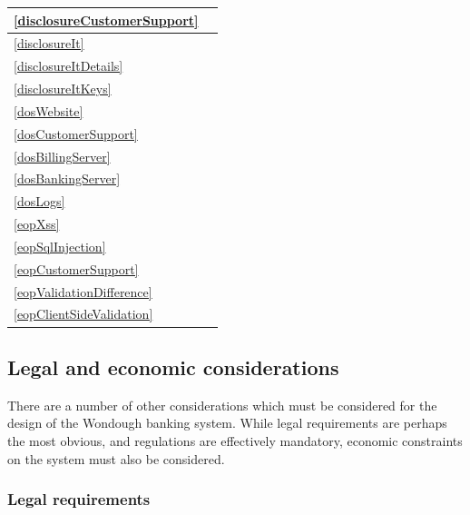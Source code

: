 \begin{center}
\begin{tabular}{|| p{3em} | p{15em} ||}
    \\ \hline \ref{disclosureCustomerSupport} &
        
    \\ \hline \ref{disclosureIt} &
        
    \\ \hline \ref{disclosureItDetails} &
        
    \\ \hline \ref{disclosureItKeys} &
        
    \\ \hline \ref{dosWebsite} &
        
    \\ \hline \ref{dosCustomerSupport} &
        
    \\ \hline \ref{dosBillingServer} &
        
    \\ \hline \ref{dosBankingServer} &
        
    \\ \hline \ref{dosLogs} &

    \\ \hline \ref{eopXss} &

    \\ \hline \ref{eopSqlInjection} &
        
    \\ \hline \ref{eopCustomerSupport} &

    \\ \hline \ref{eopValidationDifference} & 
        
    \\ \hline \ref{eopClientSideValidation}
        
    \\

\end{tabular}\end{center}

\subsection{Legal and economic considerations}

There are a number of other considerations which must be considered for the design of the Wondough banking system. While legal requirements are perhaps the most obvious, and regulations are effectively mandatory, economic constraints on the system must also be considered.

\subsubsection{Legal requirements}



